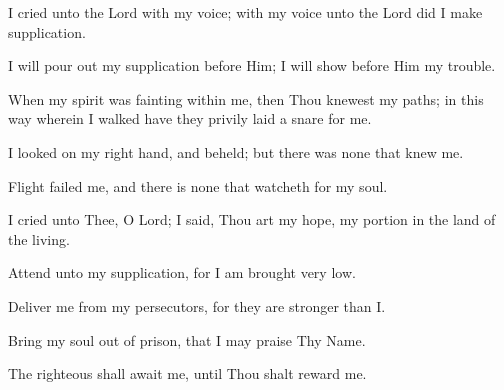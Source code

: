 I cried unto the Lord with my voice; with my voice unto the Lord did I make supplication.

I will pour out my supplication before Him; I will show before Him my trouble.

When my spirit was fainting within me, then Thou knewest my paths; in this way wherein I walked have they privily laid a snare for me.

I looked on my right hand, and beheld; but there was none that knew me.

Flight failed me, and there is none that watcheth for my soul.

I cried unto Thee, O Lord; I said, Thou art my hope, my portion in the land of the living.

Attend unto my supplication, for I am brought very low.

Deliver me from my persecutors, for they are stronger than I.

Bring my soul out of prison, that I may praise Thy Name.

The righteous shall await me, until Thou shalt reward me.
